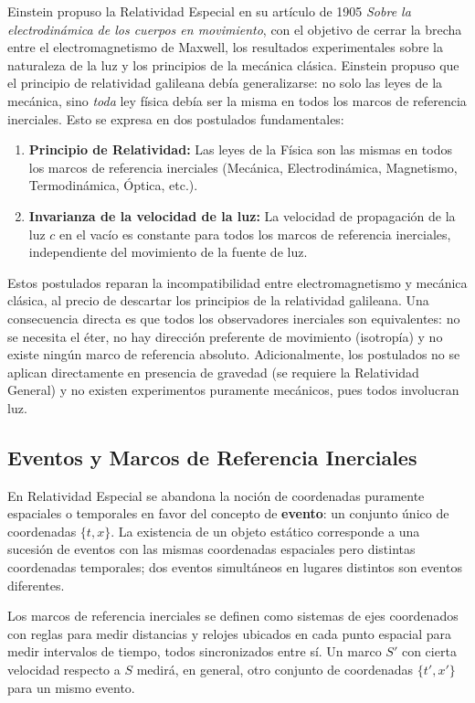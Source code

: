 Einstein propuso la Relatividad Especial en su artículo de 1905 \textit{Sobre la electrodinámica de los cuerpos en movimiento}, con el objetivo de cerrar la brecha entre el electromagnetismo de Maxwell, los resultados experimentales sobre la naturaleza de la luz y los principios de la mecánica clásica. Einstein propuso que el principio de relatividad galileana debía generalizarse: no solo las leyes de la mecánica, sino \textit{toda} ley física debía ser la misma en todos los marcos de referencia inerciales. Esto se expresa en dos postulados fundamentales:

\begin{enumerate}
    \item \textbf{Principio de Relatividad:} Las leyes de la Física son las mismas en todos los marcos de referencia inerciales (Mecánica, Electrodinámica, Magnetismo, Termodinámica, Óptica, etc.).
    \item \textbf{Invarianza de la velocidad de la luz:} La velocidad de propagación de la luz $c$ en el vacío es constante para todos los marcos de referencia inerciales, independiente del movimiento de la fuente de luz.
\end{enumerate}

Estos postulados reparan la incompatibilidad entre electromagnetismo y mecánica clásica, al precio de descartar los principios de la relatividad galileana. Una consecuencia directa es que todos los observadores inerciales son equivalentes: no se necesita el éter, no hay dirección preferente de movimiento (isotropía) y no existe ningún marco de referencia absoluto. Adicionalmente, los postulados no se aplican directamente en presencia de gravedad (se requiere la Relatividad General) y no existen experimentos puramente mecánicos, pues todos involucran luz.

\subsection{Eventos y Marcos de Referencia Inerciales}

En Relatividad Especial se abandona la noción de coordenadas puramente espaciales o temporales en favor del concepto de \textbf{evento}: un conjunto único de coordenadas $\{t, x\}$. La existencia de un objeto estático corresponde a una sucesión de eventos con las mismas coordenadas espaciales pero distintas coordenadas temporales; dos eventos simultáneos en lugares distintos son eventos diferentes.

Los marcos de referencia inerciales se definen como sistemas de ejes coordenados con reglas para medir distancias y relojes ubicados en cada punto espacial para medir intervalos de tiempo, todos sincronizados entre sí. Un marco $S'$ con cierta velocidad respecto a $S$ medirá, en general, otro conjunto de coordenadas $\{t', x'\}$ para un mismo evento.

